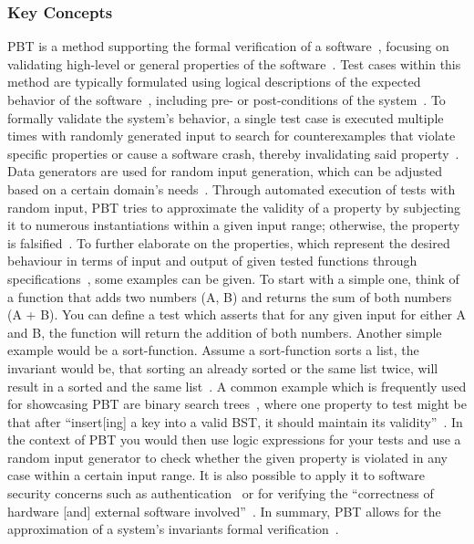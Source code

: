 \documentclass[runningheads]{llncs}
\begin{document}
\subsubsection{Key Concepts}
PBT is a method supporting the formal verification of a software~\cite{Chen2022,Fink1997,Honarvar2020,Paraskevopoulou2015}, focusing on validating high-level or general properties of the software~\cite{Fink1997,Honarvar2020,Corgozinho2023}. Test cases within this method are typically formulated using logical descriptions of the expected behavior of the software~\cite{Chen2022,Fink1997,Honarvar2020,Loescher2017,Corgozinho2023}, including pre- or post-conditions of the system~\cite{Honarvar2020}. To formally validate the system's behavior, a single test case is executed multiple times with randomly generated input to search for counterexamples that violate specific properties or cause a software crash, thereby invalidating said property~\cite{Chen2022,Loescher2017,Padhye2019,ElazarMittelman2023,Paraskevopoulou2015,Corgozinho2023}. Data generators are used for random input generation, which can be adjusted based on a certain domain's needs~\cite{Chen2022,Loescher2017,Padhye2019,ElazarMittelman2023}. Through automated execution of tests with random input, PBT tries to approximate the validity of a property by subjecting it to numerous instantiations within a given input range; otherwise, the property is falsified~\cite{Fink1997,ElazarMittelman2023,Corgozinho2023,Paraskevopoulou2015}. To further elaborate on the properties, which represent the desired behaviour in terms of input and output of given tested functions through specifications~\cite{Chen2022,Fink1997,Loescher2017}, some examples can be given. To start with a simple one, think of a function that adds two numbers (A, B) and returns the sum of both numbers (A + B). You can define a test which asserts that for any given input for either A and B, the function will return the addition of both numbers. Another simple example would be a sort-function. Assume a sort-function sorts a list, the invariant would be, that sorting an already sorted or the same list twice, will result in a sorted and the same list~\cite{Corgozinho2023}. A common example which is frequently used for showcasing PBT are binary search trees~\cite{Corgozinho2023,Shi2023}, where one property to test might be that after ``insert[ing] a key into a valid BST, it should maintain its validity''~\cite{Shi2023}. In the context of PBT you would then use logic expressions for your tests and use a random input generator to check whether the given property is violated in any case within a certain input range. It is also possible to apply it to software security concerns such as authentication~\cite{Fink1997} or for verifying the ``correctness of hardware [and] external software involved''~\cite{Chen2022}. In summary, PBT allows for the approximation of a system's invariants formal verification~\cite{Fink1997,ElazarMittelman2023,Corgozinho2023}.
\end{document}
